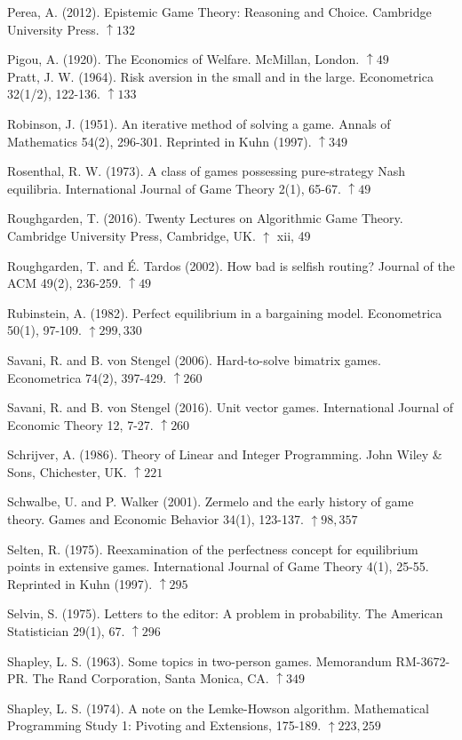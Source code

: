 \documentclass[12pt]{article}
\begin{document}
Perea, A. (2012). Epistemic Game Theory: Reasoning and Choice. Cambridge University Press. $\uparrow 132$

Pigou, A. (1920). The Economics of Welfare. McMillan, London. $\uparrow 49$\\
Pratt, J. W. (1964). Risk aversion in the small and in the large. Econometrica 32(1/2), 122-136. $\uparrow 133$

Robinson, J. (1951). An iterative method of solving a game. Annals of Mathematics 54(2), 296-301. Reprinted in Kuhn (1997). $\uparrow 349$

Rosenthal, R. W. (1973). A class of games possessing pure-strategy Nash equilibria. International Journal of Game Theory 2(1), 65-67. $\uparrow 49$

Roughgarden, T. (2016). Twenty Lectures on Algorithmic Game Theory. Cambridge University Press, Cambridge, UK. $\uparrow$ xii, 49

Roughgarden, T. and É. Tardos (2002). How bad is selfish routing? Journal of the ACM 49(2), 236-259. $\uparrow 49$

Rubinstein, A. (1982). Perfect equilibrium in a bargaining model. Econometrica 50(1), 97-109. $\uparrow 299,330$

Savani, R. and B. von Stengel (2006). Hard-to-solve bimatrix games. Econometrica 74(2), 397-429. $\uparrow 260$

Savani, R. and B. von Stengel (2016). Unit vector games. International Journal of Economic Theory 12, 7-27. $\uparrow 260$

Schrijver, A. (1986). Theory of Linear and Integer Programming. John Wiley \& Sons, Chichester, UK. $\uparrow 221$

Schwalbe, U. and P. Walker (2001). Zermelo and the early history of game theory. Games and Economic Behavior 34(1), 123-137. $\uparrow 98,357$

Selten, R. (1975). Reexamination of the perfectness concept for equilibrium points in extensive games. International Journal of Game Theory 4(1), 25-55. Reprinted in Kuhn (1997). $\uparrow 295$

Selvin, S. (1975). Letters to the editor: A problem in probability. The American Statistician 29(1), 67. $\uparrow 296$

Shapley, L. S. (1963). Some topics in two-person games. Memorandum RM-3672-PR. The Rand Corporation, Santa Monica, CA. $\uparrow 349$

Shapley, L. S. (1974). A note on the Lemke-Howson algorithm. Mathematical Programming Study 1: Pivoting and Extensions, 175-189. $\uparrow 223,259$
\end{document}

